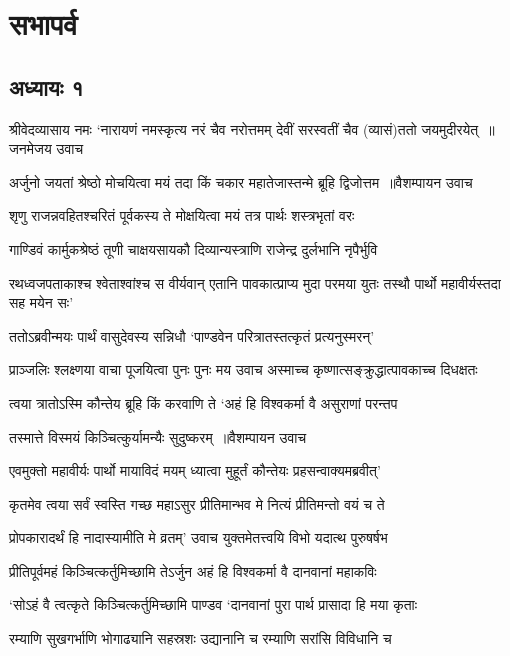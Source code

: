 \part{सभापर्व}
\chapter{अध्यायः १}
श्रीवेदव्यासाय नमः
\threelineshloka
{`नारायणं नमस्कृत्य नरं चैव नरोत्तमम्}
{देवीं सरस्वतीं चैव (व्यासं)ततो जयमुदीरयेत् ॥जनमेजय उवाच}
{}


\threelineshloka
{अर्जुनो जयतां श्रेष्ठो मोचयित्वा मयं तदा}
{किं चकार महातेजास्तन्मे ब्रूहि द्विजोत्तम ॥वैशम्पायन उवाच}
{}


\twolineshloka
{शृणु राजन्नवहितश्चरितं पूर्वकस्य ते}
{मोक्षयित्वा मयं तत्र पार्थः शस्त्रभृतां वरः}


\twolineshloka
{गाण्डिवं कार्मुकश्रेष्ठं तूणी चाक्षयसायकौ}
{दिव्यान्यस्त्राणि राजेन्द्र दुर्लभानि नृपैर्भुवि}


\threelineshloka
{रथध्वजपताकाश्च श्वेताश्वांश्च स वीर्यवान्}
{एतानि पावकात्प्राप्य मुदा परमया युतः}
{तस्थौ पार्थो महावीर्यस्तदा सह मयेन सः'}


\twolineshloka
{ततोऽब्रवीन्मयः पार्थं वासुदेवस्य सन्निधौ}
{`पाण्डवेन परित्रातस्तत्कृतं प्रत्यनुस्मरन्'}


\threelineshloka
{प्राञ्जलिः श्लक्ष्णया वाचा पूजयित्वा पुनः पुनः}
{मय उवाच}
{अस्माच्च कृष्णात्सङ्क्रुद्धात्पावकाच्च दिधक्षतः}


\twolineshloka
{त्वया त्रातोऽस्मि कौन्तेय ब्रूहि किं करवाणि ते}
{`अहं हि विश्वकर्मा वै असुराणां परन्तप}


\twolineshloka
{तस्मात्ते विस्मयं किञ्चित्कुर्यामन्यैः सुदुष्करम् ॥वैशम्पायन उवाच}
{}


\twolineshloka
{एवमुक्तो महावीर्यः पार्थो मायाविदं मयम्}
{ध्यात्वा मुहूर्तं कौन्तेयः प्रहसन्वाक्यमब्रवीत्'}


\twolineshloka
{कृतमेव त्वया सर्वं स्वस्ति गच्छ महाऽसुर}
{प्रीतिमान्भव मे नित्यं प्रीतिमन्तो वयं च ते}


\threelineshloka
{प्रोपकारादर्थं हि नादास्यामीति मे व्रतम्'}
{उवाच}
{युक्तमेतत्त्वयि विभो यदात्थ पुरुषर्षभ}


\twolineshloka
{प्रीतिपूर्वमहं किञ्चित्कर्तुमिच्छामि तेऽर्जुन}
{अहं हि विश्वकर्मा वै दानवानां महाकविः}


\twolineshloka
{`सोऽहं वै त्वत्कृते किञ्चित्कर्तुमिच्छामि पाण्डव}
{`दानवानां पुरा पार्थ प्रासादा हि मया कृताः}


\twolineshloka
{रम्याणि सुखगर्भाणि भोगाढ्यानि सहस्रशः}
{उद्यानानि च रम्याणि सरांसि विविधानि च}


